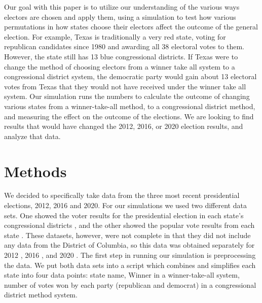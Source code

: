 \documentclass{article}
\begin{document}
Our goal with this paper is to utilize our understanding of the various ways electors are chosen and apply them, using a simulation to test how various permutations in how states choose their electors affect the outcome of the general election. For example, Texas is traditionally a very red state, voting for republican candidates since 1980 and awarding all 38 electoral votes to them. However, the state still has 13 blue congressional districts. If Texas were to change the method of choosing electors from a winner take all system to a congressional district system, the democratic party would gain about 13 electoral votes from Texas that they would not have received under the winner take all system.  Our simulation runs the numbers to calculate the outcome of changing various states from a winner-take-all method, to a congressional district method, and measuring the effect on the outcome of the elections. We are looking to find results that would have changed the 2012, 2016, or 2020 election results, and analyze that data.

\section{Methods}
We decided to specifically take data from the three most recent presidential elections, 2012, 2016 and 2020. For our simulations we used two different data sets. One showed the voter results for the presidential election in each state’s congressional districts \cite{kos}, and the other showed the popular vote results from each state \cite{pop}. These datasets, however, were not complete in that they did not include any data from the District of Columbia, so this data was obtained separately for 2012 \cite{dc3}, 2016 \cite{dc2}, and 2020 \cite{dc1}. The first step in running our simulation is preprocessing the data. We put both data sets into a script which combines and simplifies each state into four data points: state name, Winner in a winner-take-all system, number of votes won by each party (republican and democrat) in a congressional district method system.
\end{document}
